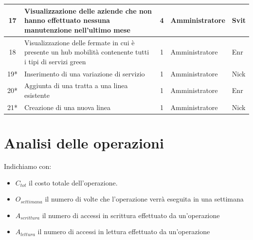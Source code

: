 \documentclass[12pt,a4paper]{report}
\begin{document}
\begin{longtable}{|c|p{7.5cm}|c|l|l|}
\hline
17 & Visualizzazione delle aziende che non hanno effettuato nessuna manutenzione nell'ultimo mese & 4 & Amministratore & Svit  \\
\hline
18 & Visualizzazione delle fermate in cui è presente un hub mobilità contenente tutti i tipi di servizi green & 1 & Amministratore  & Enr \\
\hline
19* & Inserimento di una variazione di servizio & 1 & Amministratore & Nick \\
\hline
20* & Aggiunta di una tratta a una linea esistente & 1 & Amministratore & Enr \\
\hline
21* & Creazione di una nuova linea & 1 & Amministratore & Nick \\
\hline
\end{longtable}

\section{Analisi delle operazioni}
Indichiamo con:
\begin{itemize}
	\item ${C_{tot}}$ il costo totale dell'operazione.
	\item ${O_{settimana}}$ il numero di volte che l'operazione verrà eseguita in una settimana
	\item ${A_{scrittura}}$ il numero di accessi in scrittura effettuato da un'operazione
	\item ${A_{lettura}}$ il numero di accessi in lettura effettuato da un'operazione
\end{itemize}
\end{document}
